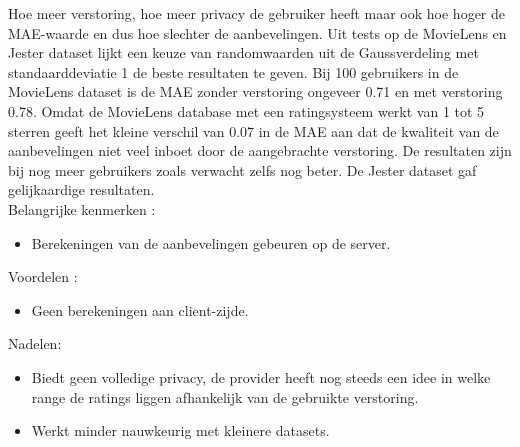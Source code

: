 Hoe meer verstoring, hoe meer privacy de gebruiker heeft maar ook hoe hoger de MAE-waarde en dus hoe slechter de aanbevelingen. Uit tests op de MovieLens en Jester dataset lijkt een keuze van randomwaarden uit de Gaussverdeling met standaarddeviatie 1 de beste resultaten te geven. Bij 100 gebruikers in de MovieLens dataset is de MAE zonder verstoring ongeveer 0.71 en met verstoring 0.78. Omdat de MovieLens database met een ratingsysteem werkt van 1 tot 5 sterren geeft het kleine verschil van 0.07 in de MAE aan dat de kwaliteit van de aanbevelingen niet veel inboet door de aangebrachte verstoring.  De resultaten zijn bij nog meer gebruikers zoals verwacht zelfs nog beter. De Jester dataset gaf gelijkaardige resultaten.\\

Belangrijke kenmerken :
\begin{itemize}
 
\item Berekeningen van de aanbevelingen gebeuren op de server.
\end{itemize}
Voordelen : 
\begin{itemize}
\item Geen berekeningen aan client-zijde.
\end{itemize}
Nadelen:
\begin{itemize}
\item Biedt geen volledige privacy, de provider heeft nog steeds een idee in welke range de ratings liggen afhankelijk van de gebruikte verstoring. 
\item Werkt minder nauwkeurig met kleinere datasets.

\end{itemize}
